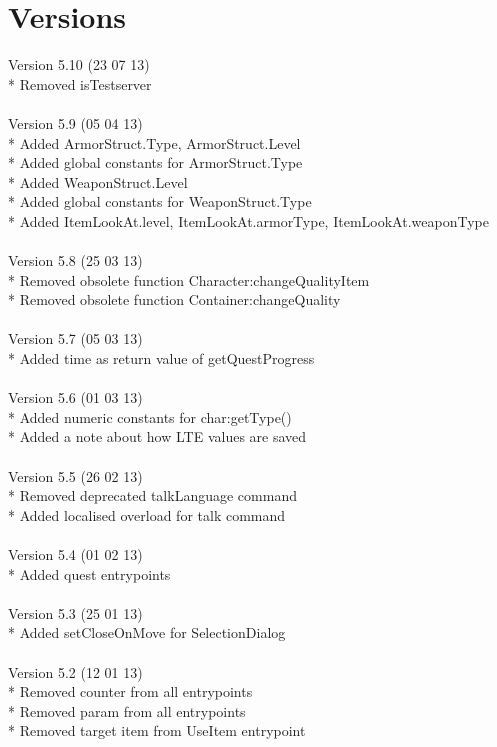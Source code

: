 \documentclass[a4paper,10pt,makeidx]{scrreprt}
\begin{document}
\chapter{Versions}
Version 5.10 (23 07 13)\\
* Removed isTestserver\\
\\
Version 5.9 (05 04 13)\\
* Added ArmorStruct.Type, ArmorStruct.Level\\
* Added global constants for ArmorStruct.Type\\
* Added WeaponStruct.Level\\
* Added global constants for WeaponStruct.Type\\
* Added ItemLookAt.level, ItemLookAt.armorType, ItemLookAt.weaponType\\
\\
Version 5.8 (25 03 13)\\
* Removed obsolete function Character:changeQualityItem\\
* Removed obsolete function Container:changeQuality\\
\\
Version 5.7 (05 03 13)\\
* Added time as return value of getQuestProgress\\
\\
Version 5.6 (01 03 13)\\
* Added numeric constants for char:getType()\\
* Added a note about how LTE values are saved\\
\\
Version 5.5 (26 02 13)\\
* Removed deprecated talkLanguage command\\
* Added localised overload for talk command\\
\\
Version 5.4 (01 02 13)\\
* Added quest entrypoints\\
\\
Version 5.3 (25 01 13)\\
* Added setCloseOnMove for SelectionDialog\\
\\
Version 5.2 (12 01 13)\\
* Removed counter from all entrypoints\\
* Removed param from all entrypoints\\
* Removed target item from UseItem entrypoint\\
\end{document}
